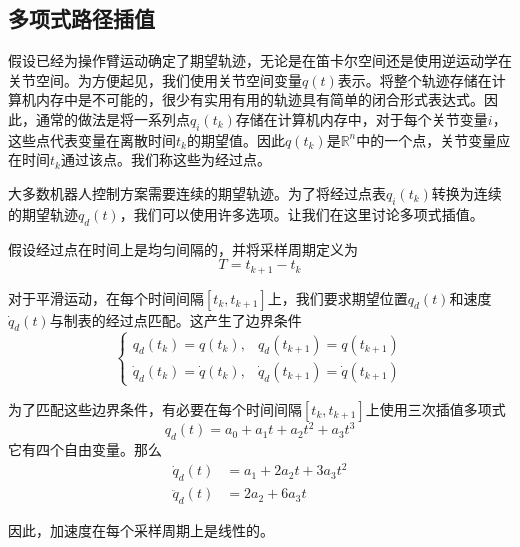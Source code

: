 \documentclass[UTF8]{ctexart}
\theoremstyle{definition}
\begin{document}
\subsection{多项式路径插值}

假设已经为操作臂运动确定了期望轨迹，无论是在笛卡尔空间还是使用逆运动学在关节空间。为方便起见，我们使用关节空间变量$q(t)$表示。将整个轨迹存储在计算机内存中是不可能的，很少有实用有用的轨迹具有简单的闭合形式表达式。因此，通常的做法是将一系列点$q_i(t_k)$存储在计算机内存中，对于每个关节变量$i$，这些点代表变量在离散时间$t_k$的期望值。因此$q(t_k)$是$\mathbb{R}^n$中的一个点，关节变量应在时间$t_k$通过该点。我们称这些为经过点。

大多数机器人控制方案需要连续的期望轨迹。为了将经过点表$q_i(t_k)$转换为连续的期望轨迹$q_d(t)$，我们可以使用许多选项。让我们在这里讨论多项式插值。

假设经过点在时间上是均匀间隔的，并将采样周期定义为
\begin{equation}
    T = t_{k+1} - t_k
\end{equation}

对于平滑运动，在每个时间间隔$[t_k, t_{k+1}]$上，我们要求期望位置$q_d(t)$和速度$\dot{q}_d(t)$与制表的经过点匹配。这产生了边界条件
\begin{equation}
    \begin{cases}
        q_d(t_k) = q(t_k), & q_d(t_{k+1}) = q(t_{k+1}) \\
        \dot{q}_d(t_k) = \dot{q}(t_k), & \dot{q}_d(t_{k+1}) = \dot{q}(t_{k+1})
    \end{cases}
\end{equation}

为了匹配这些边界条件，有必要在每个时间间隔$[t_k, t_{k+1}]$上使用三次插值多项式
\begin{equation}
    q_d(t) = a_0 + a_1t + a_2t^2 + a_3t^3
\end{equation}
它有四个自由变量。那么
\begin{align}
    \dot{q}_d(t) &= a_1 + 2a_2t + 3a_3t^2 \\
    \ddot{q}_d(t) &= 2a_2 + 6a_3t
\end{align}

因此，加速度在每个采样周期上是线性的。
\end{document}
